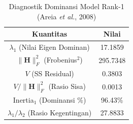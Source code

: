 \begin{table}[H]
\centering
\small
\caption{Diagnostik Dominansi Model Rank-1 (Areia \textit{et al.}, 2008)} \label{tab:sample1struktur_diagnostik}
\begin{tabular}{|c|c|}
\hline
\textbf{Kuantitas} & \textbf{Nilai} \\
\hline
$\lambda_1$ (Nilai Eigen Dominan) & 17.1859 \\
$\|\mathbf{H}\|_F^2$ (Frobenius$^2$) & 295.7348 \\
$V$ (SS Residual) & 0.3803 \\
$V / \|\mathbf{H}\|_F^2$ (Rasio Sisa) & 0.0013 \\
Inertia$_1$ (Dominansi \%) & 96.43\% \\
$\lambda_1 / \lambda_2$ (Rasio Kegentingan) & 27.8833 \\
\hline
\end{tabular}
\end{table}
